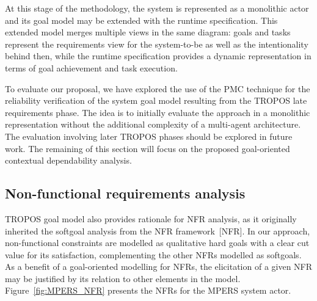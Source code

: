 At this stage of the methodology, the system is represented as a monolithic actor and its goal model may be extended with the runtime specification. This extended model merges multiple views in the same diagram: goals and tasks represent the requirements view for the system-to-be as well as the intentionality behind then, while the runtime specification provides a dynamic representation in terms of goal achievement  and task execution.

To evaluate our proposal, we have explored the use of the PMC technique for the reliability verification of the system goal model resulting from the TROPOS late requirements phase. The idea is to initially evaluate the approach in a monolithic representation without the additional complexity of a multi-agent architecture. The evaluation involving later TROPOS phases should be explored in future work. The remaining of this section will focus on the proposed goal-oriented contextual dependability analysis.



\subsection{Non-functional requirements analysis}


TROPOS goal model also provides rationale for NFR analysis, as it originally inherited the softgoal analysis from the NFR framework~[NFR]. In our approach, non-functional constraints are modelled as qualitative hard goals with a clear cut value for its satisfaction, complementing the other NFRs modelled as softgoals. As a benefit of a goal-oriented modelling for NFRs, the elicitation of a given NFR may be justified by its relation to other elements in the model. Figure~\ref{fig:MPERS_NFR} presents the NFRs for the MPERS system actor.

